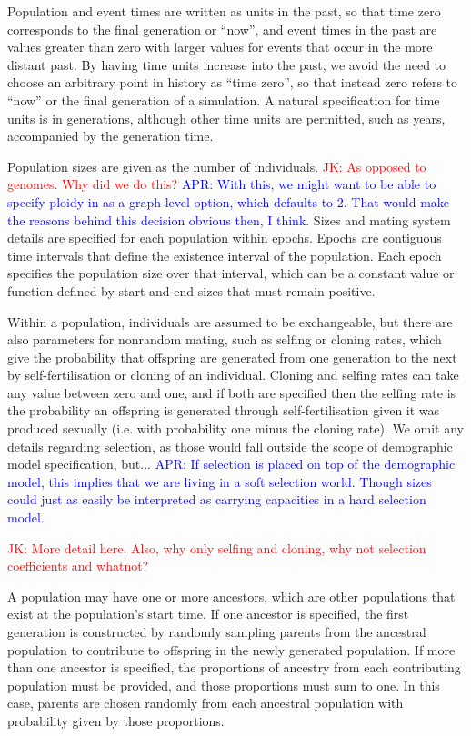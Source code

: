 \documentclass[11pt]{article}
\newcommand{\aprcomment}[1]{{\textcolor{blue}{APR: #1}}}
\newcommand{\jkcomment}[1]{{\textcolor{red}{JK: #1}}}
\begin{document}
Population and event times are written as units in the past, so that time zero
corresponds to the final generation or ``now'', and event times in the past are
values greater than zero with larger values for events that occur in the more
distant past. By having time units increase into the past, we avoid the need to
choose an arbitrary point in history as ``time zero'', so that instead zero
refers to ``now'' or the final generation of a simulation. A natural
specification for time units is in generations, although other time units are
permitted, such as years, accompanied by the generation time.

Population sizes are given as the number of individuals.
\jkcomment{As opposed to genomes. Why did we do this?}
\aprcomment{With this, we might want to be able to specify ploidy in as
a graph-level option, which defaults to 2. That would make the reasons
behind this decision obvious then, I think.}
Sizes and mating system details are specified for each population within
epochs. Epochs are contiguous time intervals that define
the existence interval of the population. Each epoch specifies the population size
over that interval, which can be a constant value or function defined by start
and end sizes that must remain positive.

Within a population, individuals are assumed to be exchangeable, but there are
also parameters for nonrandom mating, such as selfing or cloning rates, which
give the probability that offspring are generated from one generation to the
next by self-fertilisation or cloning of an individual. Cloning and selfing
rates can take any value between zero and one, and if both are specified then
the selfing rate is the probability an offspring is generated through
self-fertilisation given it was produced sexually (i.e. with probability one
minus the cloning rate). We omit any details regarding selection, as those would
fall outside the scope of demographic model specification, but...
\aprcomment{If selection is placed on top of the demographic model, this implies
that we are living in a soft selection world. Though sizes could just as easily
be interpreted as carrying capacities in a hard selection model.}

\jkcomment{More detail here. Also, why only selfing and cloning, why not selection
coefficients and whatnot?}

A population may have one
or more ancestors, which are other populations that exist at the population's
start time. If one ancestor is specified, the first generation is constructed
by randomly sampling parents from the ancestral population to contribute to
offspring in the newly generated population. If more than one ancestor is
specified, the proportions of ancestry from each contributing population must
be provided, and those proportions must sum to one. In this case, parents are
chosen randomly from each ancestral population with probability given by those
proportions.
\end{document}
